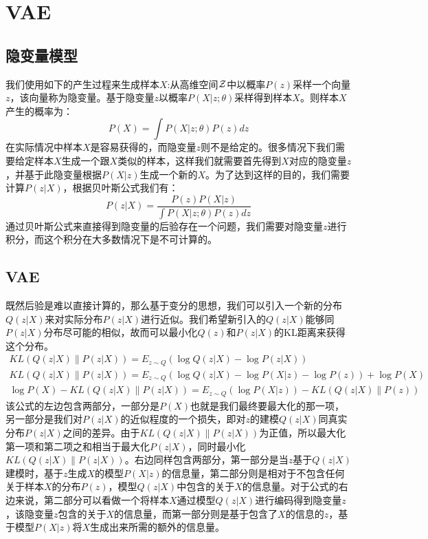 
\chapter{VAE}

\section{隐变量模型}
我们使用如下的产生过程来生成样本$X$:从高维空间$\cal{Z}$中以概率$P(z)$采样一个向量$z$，该向量称为隐变量。基于隐变量$z$以概率$P(X|z;\theta)$采样得到样本$X$。则样本$X$产生的概率为：
\begin{displaymath}
P(X) = \int{P(X|z;\theta)}P(z)dz
\end{displaymath} 
在实际情况中样本$X$是容易获得的，而隐变量$z$则不是给定的。很多情况下我们需要给定样本$X$生成一个跟$X$类似的样本，这样我们就需要首先得到$X$对应的隐变量$z$，并基于此隐变量根据$P(X|z)$生成一个新的$X$。为了达到这样的目的，我们需要计算$P(z|X)$，根据贝叶斯公式我们有：
\begin{displaymath}
P(z|X) = \frac{P(z)P(X|z)}{\int{P(X|z;\theta)}P(z)dz} 
\end{displaymath} 
通过贝叶斯公式来直接得到隐变量的后验存在一个问题，我们需要对隐变量$z$进行积分，而这个积分在大多数情况下是不可计算的。
\section{VAE}
既然后验是难以直接计算的，那么基于变分的思想，我们可以引入一个新的分布$Q(z|X)$来对实际分布$P(z|X)$进行近似。我们希望新引入的$Q(z|X)$能够同$P(z|X)$分布尽可能的相似，故而可以最小化$Q(z)$和$P(z|X)$的KL距离来获得这个分布。
\begin{displaymath}
\begin{split}
KL(Q(z|X)\|P(z|X)) = E_{z \sim Q}(\log{Q(z|X)} - \log {P(z|X)})\\
KL(Q(z|X)\|P(z|X)) = E_{z \sim Q}(\log{Q(z|X)} - \log {P(X|z)-\log P(z)}) + \log P(X)\\
\log P(X) - KL(Q(z|X)\|P(z|X)) = E_{z \sim Q}(\log {P(X|z)}) -KL(Q(z|X) \| P(z)) 
\end{split}
\end{displaymath} 
该公式的左边包含两部分，一部分是$P(X)$也就是我们最终要最大化的那一项，另一部分是我们对$P(z|X)$的近似程度的一个损失，即对$z$的建模$Q(z|X)$同真实分布$P(z|X)$之间的差异。由于$KL(Q(z|X)\|P(z|X))$为正值，所以最大化第一项和第二项之和相当于最大化$P(z|X)$，同时最小化$KL(Q(z|X)\|P(z|X))$。右边同样包含两部分，第一部分是当$z$基于$Q(z|X)$建模时，基于$z$生成$X$的模型$P(X|z)$的信息量，第二部分则是相对于不包含任何关于样本$X$的分布$P(z)$，模型$Q(z|X)$中包含的关于$X$的信息量。对于公式的右边来说，第二部分可以看做一个将样本$X$通过模型$Q(z|X)$进行编码得到隐变量$z$，该隐变量$z$包含的关于$X$的信息量，而第一部分则是基于包含了$X$的信息的$z$，基于模型$P(X|z)$将$X$生成出来所需的额外的信息量。

